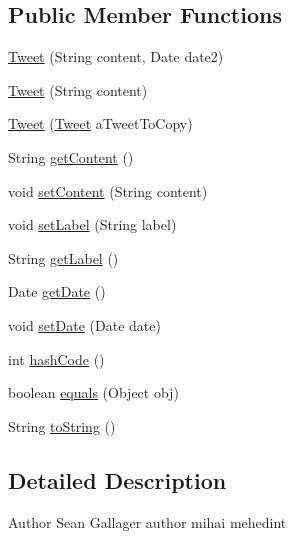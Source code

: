 \subsection*{Public Member Functions}
\begin{DoxyCompactItemize}
\item 
\hyperlink{classbridges_1_1data__src__dependent_1_1_tweet_a615278c2672b2cb310d3c645566ad5cd}{Tweet} (String content, Date date2)
\item 
\hyperlink{classbridges_1_1data__src__dependent_1_1_tweet_a611e969f630c86098b204cfb4655f79b}{Tweet} (String content)
\item 
\hyperlink{classbridges_1_1data__src__dependent_1_1_tweet_a0b0ee5fa9a6221da95020bd5f78667d9}{Tweet} (\hyperlink{classbridges_1_1data__src__dependent_1_1_tweet}{Tweet} a\+Tweet\+To\+Copy)
\item 
String \hyperlink{classbridges_1_1data__src__dependent_1_1_tweet_a9b48f1ffc14fea21eb8a3e742601974a}{get\+Content} ()
\item 
void \hyperlink{classbridges_1_1data__src__dependent_1_1_tweet_a80ac618b5817392ce356657b2bf4145a}{set\+Content} (String content)
\item 
void \hyperlink{classbridges_1_1data__src__dependent_1_1_tweet_aa193633f4f61cc957f05a1c551f18822}{set\+Label} (String label)
\item 
String \hyperlink{classbridges_1_1data__src__dependent_1_1_tweet_a4b31431e42327efa953adde4c15cf168}{get\+Label} ()
\item 
Date \hyperlink{classbridges_1_1data__src__dependent_1_1_tweet_a801b0b5ea0127746c9c8ec0fc5e35ac2}{get\+Date} ()
\item 
void \hyperlink{classbridges_1_1data__src__dependent_1_1_tweet_a1a57c028bb87ad4e94af496a7260ffe9}{set\+Date} (Date date)
\item 
int \hyperlink{classbridges_1_1data__src__dependent_1_1_tweet_adf7dadcda59b68bb00b42480e4ad9956}{hash\+Code} ()
\item 
boolean \hyperlink{classbridges_1_1data__src__dependent_1_1_tweet_ae5edb76b9dd0f76b56eb40aa7c8cc077}{equals} (Object obj)
\item 
String \hyperlink{classbridges_1_1data__src__dependent_1_1_tweet_adfba67504a7463a7f16aff46d2bb893f}{to\+String} ()
\end{DoxyCompactItemize}


\subsection{Detailed Description}
\begin{DoxyAuthor}{Author}
Sean Gallager  author mihai mehedint 
\end{DoxyAuthor}


